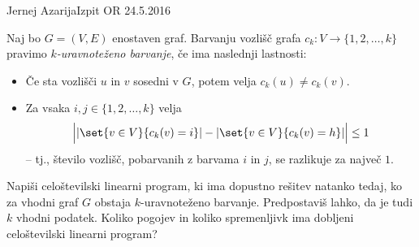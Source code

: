 \begin{naloga}{Jernej Azarija}{Izpit OR 24.5.2016}
\begin{vprasanje}
Naj bo $G = (V, E)$ enostaven graf.
Barvanju vozlišč grafa $c_k : V \to \{1, 2, \dots, k\}$
pravimo {\em $k$-uravnoteženo barvanje},
če ima naslednji lastnosti:
\begin{itemize}
\item Če sta vozlišči $u$ in $v$ sosedni v $G$,
potem velja $c_k(u) \ne c_k(v)$.
\item Za vsaka $i, j \in \{1, 2, \dots, k\}$ velja
$$
\Big| |\set{v \in V}{c_k(v) = i}| - |\set{v \in V}{c_k(v) = h}| \Big|
\le 1
$$
-- tj., število vozlišč, pobarvanih z barvama $i$ in $j$,
se razlikuje za največ $1$.
\end{itemize}
Napiši celoštevilski linearni program, ki ima dopustno rešitev natanko tedaj,
ko za vhodni graf $G$ obstaja $k$-uravnoteženo barvanje.
Predpostaviš lahko, da je tudi $k$ vhodni podatek.
Koliko pogojev in koliko spremenljivk
ima dobljeni celoštevilski linearni program?
\end{vprasanje}
\begin{odgovor}
\end{odgovor}
\end{naloga}
